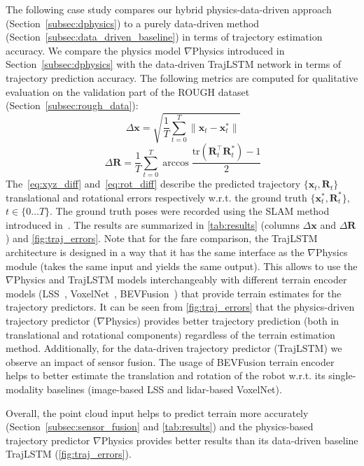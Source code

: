 The following case study compares our hybrid physics-data-driven approach (Section~\ref{subsec:dphysics})
to a purely data-driven method (Section~\ref{subsec:data_driven_baseline}) in terms of trajectory estimation accuracy.
We compare the physics model $\nabla$Physics introduced in Section~\ref{subsec:dphysics} with the data-driven TrajLSTM network in terms of trajectory prediction accuracy.
The following metrics are computed for qualitative evaluation on the validation part of the ROUGH dataset (Section~\ref{subsec:rough_data}):
\begin{equation}~\label{eq:xyz_diff}
    \Delta\mathbf{x}=\sqrt{\frac{1}{T}\sum_{t=0}^T \|\mathbf{x}_t - \mathbf{x}_t^{*}\|}
\end{equation}
\begin{equation}~\label{eq:rot_diff}
    \Delta\mathbf{R}=\frac{1}{T}\sum_{t=0}^{T}\arccos\frac{\mathrm{tr}({\mathbf{R}^{\top}_t\mathbf{R}^{*}_t})-1}{2}
\end{equation}
The~\eqref{eq:xyz_diff} and~\eqref{eq:rot_diff} describe the predicted trajectory $\{\mathbf{x}_t, \mathbf{R}_t\}$ translational and rotational errors respectively w.r.t. the ground truth $\{\mathbf{x}_t^{*}, \mathbf{R}_t^{*}\}$, $t \in \{0 \dots T\}$.
The ground truth poses were recorded using the SLAM method introduced in~\cite{Pomerleau-2013-AR}.
The results are summarized in \autoref{tab:results} (columns $\Delta\mathbf{x}$ and $\Delta\mathbf{R}$)
and \autoref{fig:traj_errors}.
Note that for the fare comparison, the TrajLSTM architecture is designed in a way that
it has the same interface as the $\nabla$Physics module (takes the same input and yields the same output).
This allows to use the $\nabla$Physics and TrajLSTM models interchangeably
with different terrain encoder models
(LSS~\cite{philion2020lift}, VoxelNet~\cite{zhou2018voxelnet}, BEVFusion~\cite{liu2023bevfusion})
that provide terrain estimates for the trajectory predictors.
It can be seen from \autoref{fig:traj_errors} that the physics-driven
trajectory predictor ($\nabla$Physics) provides better trajectory prediction
(both in translational and rotational components) regardless of the terrain estimation method.
Additionally, for the data-driven trajectory predictor (TrajLSTM) we observe an impact of sensor fusion.
The usage of BEVFusion terrain encoder helps to better estimate the translation and rotation of the robot
w.r.t. its single-modality baselines (image-based LSS and lidar-based VoxelNet).

Overall, the point cloud input helps to predict terrain more accurately
(Section~\ref{subsec:sensor_fusion} and \autoref{tab:results})
and the physics-based trajectory predictor $\nabla$Physics provides better results
than its data-driven baseline TrajLSTM (\autoref{fig:traj_errors}).


